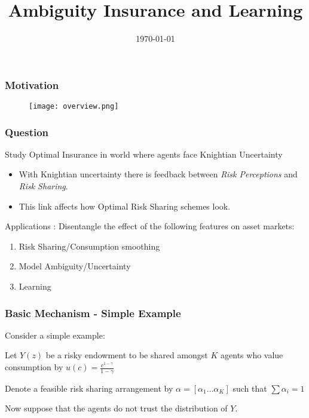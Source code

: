 \documentclass{beamer}
\title{Ambiguity Insurance and Learning}
\date{\today}
\theoremstyle{Definition}
\begin{document}
%
\begin{frame}
\titlepage
\end{frame}


\begin{frame}
\frametitle{Motivation}
\begin{figure}
  \begin{center}
   
   \texttt{[image: overview.png]}
  \end{center} 
		
	\end{figure}

\end{frame}


\begin{frame}
\frametitle{Question}
Study Optimal Insurance in world where agents face Knightian Uncertainty

\begin{itemize}
	\item With Knightian uncertainty there is feedback between \emph{Risk Perceptions} and \emph{Risk Sharing}.
	\item This link affects how Optimal Risk Sharing schemes look.
\end{itemize}

Applications : Disentangle the effect of the following features on asset markets:

\begin{enumerate}
	\item Risk Sharing/Consumption smoothing
	\item Model Ambiguity/Uncertainty
	\item Learning
\end{enumerate}

\end{frame}
\begin{frame}
\frametitle{Basic Mechanism - Simple Example}

Consider a simple example:




Let $Y(z)$ be a risky endowment to be shared amongst $K$ agents who value consumption by $u(c)=\frac{c^{1-\gamma}}{1-\gamma}$




Denote a feasible risk sharing arrangement by $\alpha = [\alpha_1 \dots \alpha_K]$ such that $\sum \alpha_i=1$




Now suppose that the agents do not trust the distribution of $Y$. 



\end{frame}
\end{document}
